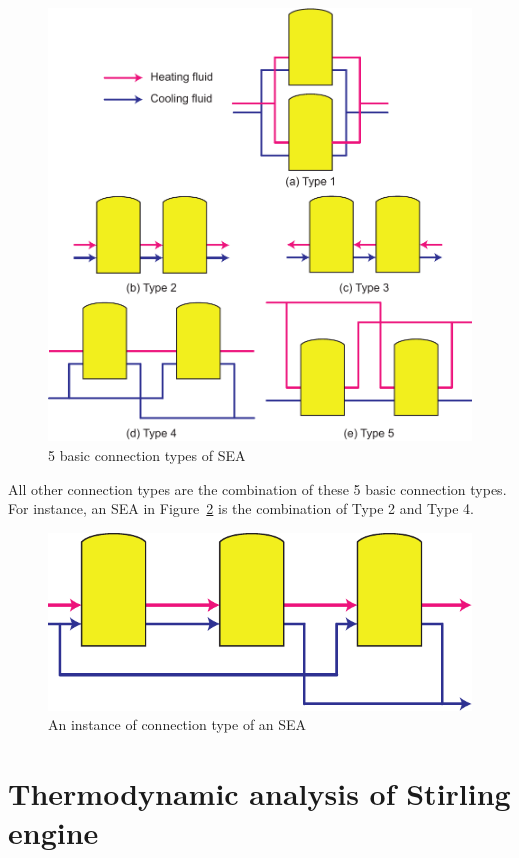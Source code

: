 \noindent \begin{figure}[htbp]
\begin{center}
	\includegraphics[width = 0.7\columnwidth]{./fig/BasicSEA}
	\caption{5 basic connection types of SEA}
	\label{fig:SEA}
\end{center}
\end{figure}

All other connection types are the combination of these 5 basic connection types. For instance, an SEA in Figure~\ref{fig:SEA_eg} is the combination of Type 2 and Type 4.

\noindent \begin{figure}[htbp]
\begin{center}
	\includegraphics[width = 0.7\columnwidth]{./fig/SEA_eg}
	\caption{An instance of connection type of an SEA}
	\label{fig:SEA_eg}
\end{center}
\end{figure}

\section{Thermodynamic analysis of Stirling engine}
